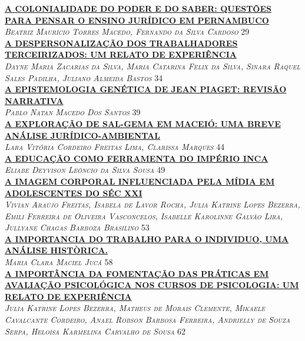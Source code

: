 \noindent \textsc{\hyperlink{trabalhos/247581.pdf.1}{\textbf{A COLONIALIDADE DO PODER E DO SABER: QUESTÕES PARA PENSAR O ENSINO JURÍDICO EM PERNAMBUCO }}}\\ 
\noindent \textsc{\textit{Beatriz Maurício Torres Macedo, Fernando da Silva Cardoso}} \hfill 29\\ 

\noindent \textsc{\hyperlink{trabalhos/251122.pdf.1}{\textbf{A DESPERSONALIZAÇÃO DOS TRABALHADORES TERCEIRIZADOS: UM RELATO DE EXPERIÊNCIA }}}\\ 
\noindent \textsc{\textit{Dayne Maria Zacarias da Silva, Maria Catarina Felix da Silva, Sinara Raquel Sales Padilha, Juliano Almeida Bastos}} \hfill 34\\ 

\noindent \textsc{\hyperlink{trabalhos/249875.pdf.1}{\textbf{A EPISTEMOLOGIA GENÉTICA DE JEAN PIAGET: REVISÃO NARRATIVA}}}\\ 
\noindent \textsc{\textit{Pablo Natan Macedo Dos Santos}} \hfill 39\\ 

\noindent \textsc{\hyperlink{trabalhos/249710.pdf.1}{\textbf{A EXPLORAÇÃO DE SAL-GEMA EM MACEIÓ: UMA BREVE ANÁLISE JURÍDICO-AMBIENTAL}}}\\ 
\noindent \textsc{\textit{Lara Vitória Cordeiro Freitas Lima, Clarissa Marques}} \hfill 44\\ 

\noindent \textsc{\hyperlink{trabalhos/242537.pdf.1}{\textbf{A EDUCAÇÃO COMO FERRAMENTA DO IMPÉRIO INCA}}}\\ 
\noindent \textsc{\textit{Eliabe Deyvison Leôncio da Silva Sousa}} \hfill 49\\ 

\noindent \textsc{\hyperlink{trabalhos/248707.pdf.1}{\textbf{A IMAGEM CORPORAL INFLUENCIADA PELA MÍDIA EM ADOLESCENTES DO SÉC XXI}}}\\ 
\noindent \textsc{\textit{Vivian Araújo Freitas, Isabela de Lavor Rocha, Julia Katrine Lopes Bezerra, Emili Ferreira de Oliveira Vasconcelos, Isabelle Karolinne Galvão Lira, Jullyane Chagas Barboza Brasilino}} \hfill 53\\ 

\noindent \textsc{\hyperlink{trabalhos/251265.pdf.1}{\textbf{A IMPORTANCIA DO TRABALHO PARA O INDIVIDUO, UMA ANÁLISE HISTÒRICA.}}}\\ 
\noindent \textsc{\textit{Maria Clara Maciel Jucá}} \hfill 58\\ 

\noindent \textsc{\hyperlink{trabalhos/249053.pdf.1}{\textbf{A IMPORTÂNCIA DA FOMENTAÇÃO DAS PRÁTICAS EM AVALIAÇÃO PSICOLÓGICA NOS CURSOS DE PSICOLOGIA: UM RELATO DE EXPERIÊNCIA}}}\\ 
\noindent \textsc{\textit{Julia Katrine Lopes Bezerra, Matheus de Morais Clemente, Mikaele Cavalcante Cordeiro, Anael Robson Barbosa Ferreira, Andrielly de Souza Serpa, Heloísa Karmelina Carvalho de Sousa}} \hfill 62\\ 


